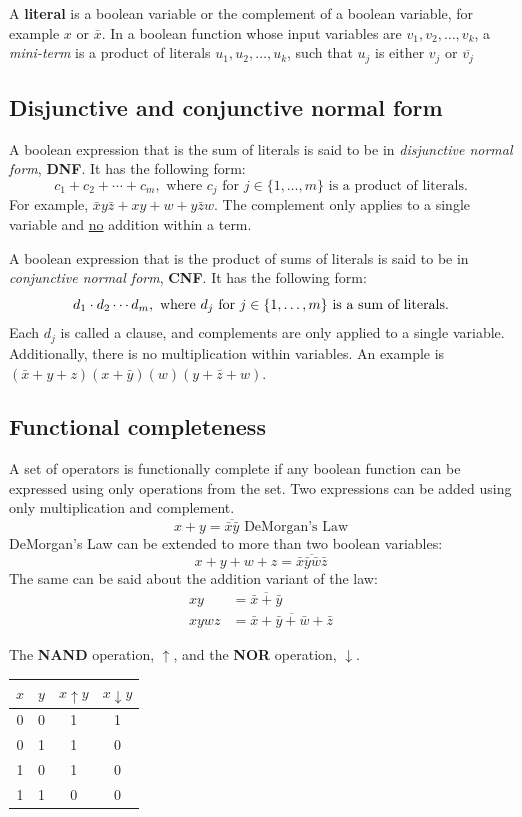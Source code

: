 A \textbf{literal} is a boolean variable or the complement of a boolean variable,
for example $x$ or $\bar{x}$. In a boolean function whose input variables are
$v_1, v_2, \ldots, v_k$, a \textit{mini-term} is a product of literals
$u_1, u_2, \ldots, u_k$, such that $u_j$ is either $v_j$ or $\overline{v_j}$

\subsection{Disjunctive and conjunctive normal form}

A boolean expression that is the sum of literals is said to be in \textit{disjunctive normal form},
\textbf{DNF}. It has the following form:
\[
  c_1 + c_2 + \cdots + c_m, \text{ where $c_j$ for $j \in \{1,\ldots,m\}$ is a product of literals.}
\]
For example, $\bar{x}y\bar{z} + xy + w + y\bar{z}w$. The complement only applies to a single variable and
\underline{no} addition within a term.

A boolean expression that is the product of sums of literals is said to be in \textit{conjunctive normal form},
\textbf{CNF}. It has the following form:
\[
  d_1 \cdot d_2 \cdots d_m, \text{ where $d_j$ for $j \in \{1,\ldots,m\}$ is a sum of literals.} \\
\]
Each $d_j$ is called a clause, and complements are only applied to a single variable.
Additionally, there is no multiplication within variables.
An example is $(\bar{x} + y + z)(x + \bar{y})(w)(y + \bar{z} + w)$.

\subsection{Functional completeness}

A set of operators is functionally complete if any boolean function can be expressed using only operations from the set.
Two expressions can be added using only multiplication and complement.
\[
  x + y = \overline{\bar{x} \bar{y}} \text{ DeMorgan's Law}
\]
DeMorgan's Law can be extended to more than two boolean variables:
\[
  x + y + w + z = \overline{\bar{x} \bar{y} \bar{w} \bar{z}}
\]
The same can be said about the addition variant of the law:
\begin{align*}
  xy   & = \overline{\bar{x} + \bar{y}}                     \\
  xywz & = \overline{\bar{x} + \bar{y} + \bar{w} + \bar{z}}
\end{align*}

The \textbf{NAND} operation, $\uparrow$, and the \textbf{NOR} operation, $\downarrow$.
\begin{center}
  \begin{tabular}{cc|cc}
    $x$ & $y$ & $x \uparrow y$ & $x \downarrow y$ \\
    \hline
    0   & 0   & 1              & 1                \\
    0   & 1   & 1              & 0                \\
    1   & 0   & 1              & 0                \\
    1   & 1   & 0              & 0
  \end{tabular}
\end{center}

